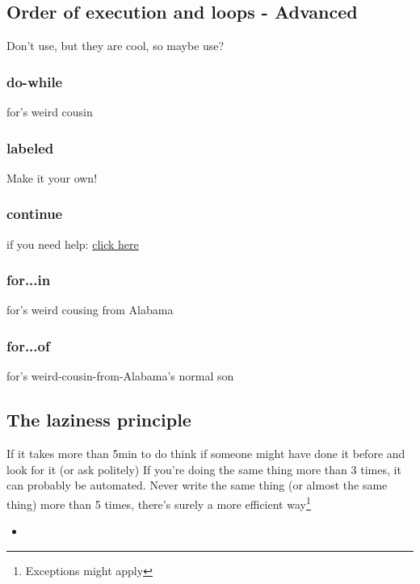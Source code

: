 \subsection{Order of execution and loops - Advanced}
\label{sub:execAdv}
Don't use, but they are cool, so maybe use?
\subsubsection{do-while}
\label{subsub:doWhile}
for's weird cousin

\subsubsection{labeled}
\label{subsub:labeled}
Make it your own!

\subsubsection{continue}
\label{subsub:continue}
if you need help: \href{http://letmegooglethat.com/?q=continue}{click here}

\subsubsection{for...in}
\label{subsub:forIn}
for's weird cousing from Alabama

\subsubsection{for...of}
\label{subsub:forOf}
for's weird-cousin-from-Alabama's normal son

\subsection{The laziness principle}
\label{sub:lazy}
If it takes more than 5min to do think if someone might have done it before and look for it (or ask politely)
If you're doing the same thing more than 3 times, it can probably be automated. Never write the same thing (or almost the same thing) more than 5 times, there's surely a more efficient way\footnote{Exceptions might apply}

\begin{itemize}
    \item
\end{itemize}
